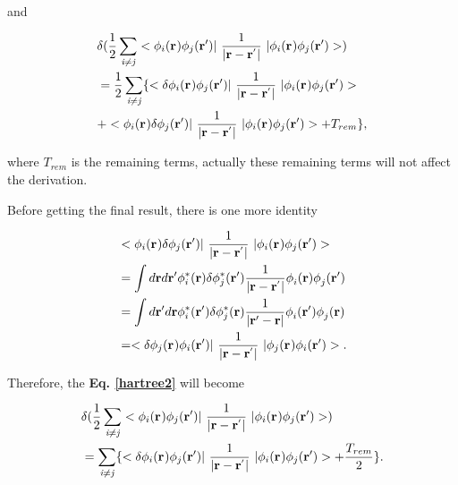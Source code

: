 \documentclass[a4paper, 12pt, titlepage,oneside,drop]{kthesis}
\begin{document}
and 

\begin{equation}\begin{split}\label{hartree2}
&  \delta( \frac{1}{2} \suminj<i><j> <\bwf<i><> \bwfn<j><'>|\ \frac{1}{|\textbf{r} - \textbf{r}^{'} |} \ | \bwf<i><> \bwfn<j><'>>)   \\
& =   \frac{1}{2} \suminj<i><j> \{  <\delta \bwf<i><> \bwfn<j><'>|\ \frac{1}{|\textbf{r} - \textbf{r}^{'} |} \ | \bwf<i><> \bwfn<j><'>>  \\
& +   < \bwf<i><> \delta \bwfn<j><'>|\ \frac{1}{|\textbf{r} - \textbf{r}^{'} |} \ | \bwf<i><> \bwfn<j><'>> +  T_{rem}\},
\end{split}\end{equation}

where $T_{rem}$ is the remaining terms, actually these remaining terms will not affect the derivation.

Before getting the final result, there is one more identity 

\begin{equation}\begin{split}\label{hartreelabel1}
& < \bwf<i><> \delta \bwfn<j><'>|\ \frac{1}{|\textbf{r} - \textbf{r}^{'} |} \ | \bwf<i><> \bwfn<j><'>> \\
& = \int d \textbf{r} d \textbf{r}{'}  \phi_{i}^{*} (\textbf{r}{}) \delta \phi_{j}^{*} (\textbf{r}{'}) \frac{1}{|\textbf{r} - \textbf{r}^{'} |}  \phi_{i}^{} (\textbf{r}{})  \phi_{j}^{} (\textbf{r}{'})\\
& = \int d \textbf{r}{'} d \textbf{r}  \phi_{i}^{*} (\textbf{r}{'}) \delta \phi_{j}^{*} (\textbf{r}{}) \frac{1}{|\textbf{r}{'} - \textbf{r} |}  \phi_{i}^{} (\textbf{r}{'})  \phi_{j}^{} (\textbf{r})\\
& = <\delta \bwf<j><> \bwfn<i><'>|\ \frac{1}{|\textbf{r} - \textbf{r}^{'} |} \ | \bwf<j><> \bwfn<i><'>>.
\end{split}\end{equation}

\noindent Therefore, the \textbf{Eq. \ref{hartree2}} will become 

\begin{equation}\begin{split}\label{hartree3}
&  \delta( \frac{1}{2} \suminj<i><j> <\bwf<i><> \bwfn<j><'>|\ \frac{1}{|\textbf{r} - \textbf{r}^{'} |} \ | \bwf<i><> \bwfn<j><'>>)   \\
& =  \suminj<i><j> \{  <\delta \bwf<i><> \bwfn<j><'>|\ \frac{1}{|\textbf{r} - \textbf{r}^{'} |} \ | \bwf<i><> \bwfn<j><'>> + \frac{T_{rem}}{2}\}.
\end{split}\end{equation}
\end{document}
